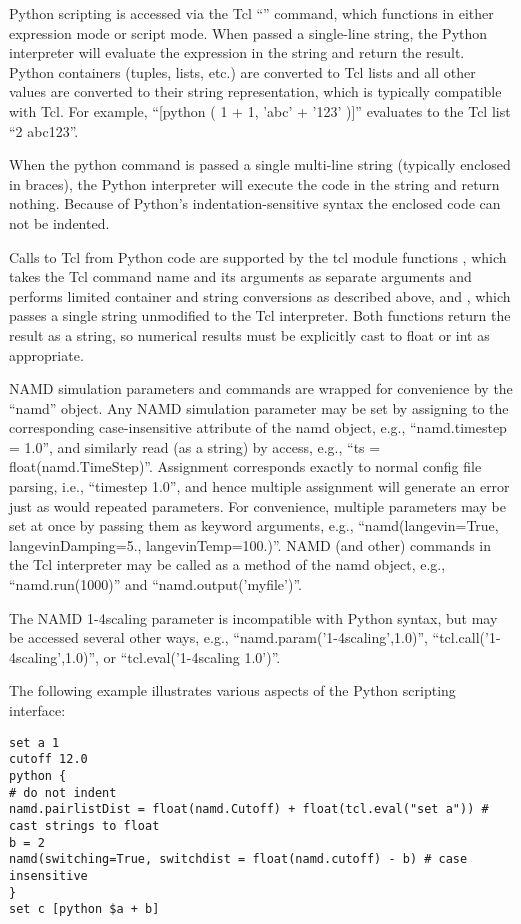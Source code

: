 Python scripting is accessed via the Tcl ``'' command,
which functions in either expression mode or script mode.
When passed a single-line string,
the Python interpreter will evaluate the expression in the string and return the result.
Python containers (tuples, lists, etc.) are converted to Tcl lists
and all other values are converted to their string representation,
which is typically compatible with Tcl.
For example, ``[python ( 1 + 1, 'abc' + '123' )]'' evaluates to the Tcl list ``2 abc123''.

When the python command is passed a single multi-line string (typically enclosed in braces),
the Python interpreter will execute the code in the string and return nothing.
Because of Python's indentation-sensitive syntax the enclosed code can not be indented.

Calls to Tcl from Python code are supported by the tcl module functions
, which takes the Tcl command name and its arguments as separate arguments
and performs limited container and string conversions as described above,
and , which passes a single string unmodified to the Tcl interpreter.
Both functions return the result as a string, so numerical results must be explicitly
cast to float or int as appropriate.

NAMD simulation parameters and commands are wrapped for convenience by the ``namd'' object.
Any NAMD simulation parameter may be set by assigning to the corresponding case-insensitive
attribute of the namd object, e.g., ``namd.timestep = 1.0'', and similarly
read (as a string) by access, e.g., ``ts = float(namd.TimeStep)''.
Assignment corresponds exactly to normal config file parsing, i.e., ``timestep 1.0'',
and hence multiple assignment will generate an error just as would repeated parameters.
For convenience, multiple parameters may be set at once by passing them as keyword arguments,
e.g., ``namd(langevin=True, langevinDamping=5., langevinTemp=100.)''.
NAMD (and other) commands in the Tcl interpreter may be called as a method of the namd object,
e.g., ``namd.run(1000)'' and ``namd.output('myfile')''.

The NAMD 1-4scaling parameter is incompatible with Python syntax, but may be accessed
several other ways, e.g., ``namd.param('1-4scaling',1.0)'', ``tcl.call('1-4scaling',1.0)'',
or ``tcl.eval('1-4scaling 1.0')''.

The following example illustrates various aspects of the Python scripting interface:
\begin{verbatim}
set a 1
cutoff 12.0
python {
# do not indent
namd.pairlistDist = float(namd.Cutoff) + float(tcl.eval("set a")) # cast strings to float
b = 2
namd(switching=True, switchdist = float(namd.cutoff) - b) # case insensitive
}
set c [python $a + b]
\end{verbatim}

